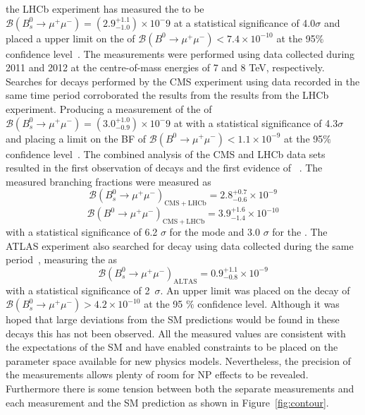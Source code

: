 the LHCb experiment has measured the \bsmumu \BF to be $\mathcal{B}(B^{0}_{s} \to \mu^+ \mu^-) = (2.9^{+1.1}_{-1.0})\times 10^-9$ at a statistical significance of 4.0$\sigma$ and placed a upper limit on the \bdmumu \BF of $\mathcal{B}(B^{0} \to \mu^+ \mu^-) < 7.4 \times 10^{-10}$ at the 95$\%$ confidence level~\cite{Aaij:2013aka}. The measurements were performed using data collected during 2011 and 2012 at the centre-of-mass energies of 7 and 8 TeV, respectively. Searches for \bmumu decays performed by the CMS experiment using data recorded in the same time period corroborated the results from the results from the LHCb experiment. Producing a measurement of the \bsmumu \BF of $\mathcal{B}(B^{0}_{s} \to \mu^+ \mu^-) = (3.0^{+1.0}_{-0.9})\times 10^-9$ at with a statistical significance of 4.3$\sigma$ and placing a limit on the \bdmumu BF of $\mathcal{B}(B^{0} \to \mu^+ \mu^-) < 1.1 \times 10^{-9}$ at the 95$\%$ confidence level~\cite{Chatrchyan:2013bka}. 
The combined analysis of the CMS and LHCb data sets resulted in the first observation of \bsmumu decays and the first evidence of \bdmumu~\cite{CMS:2014xfa}. The measured branching fractions were measured as
\begin{equation}
\mathcal{B}(B^{0}_{s} \to \mu^+ \mu^-)_{\mathrm{CMS + LHCb}}  = 2.8^{+0.7}_{-0.6} \times 10^{-9}
\end{equation}
\begin{equation}
\mathcal{B}(B^{0} \to \mu^+ \mu^-)_{\mathrm{CMS + LHCb}}  = 3.9^{+1.6}_{-1.4} \times 10^{-10}
\end{equation}
with a statistical significance of 6.2 $\sigma$ for the \bs mode and 3.0 $\sigma$ for the \bd. The ATLAS experiment also searched for \bmumu decay using data collected during the same period~\cite{Aaboud:2016ire}, measuring the \bsmumu \BF as 
\begin{equation}
\mathcal{B}(B^{0}_{s} \to \mu^+ \mu^-)_{\mathrm{ALTAS}}  = 0.9^{+1.1}_{-0.8} \times 10^{-9}
\end{equation}
with a statistical significance of 2~$\sigma$. An upper limit was placed on the \bdmumu decay of $\mathcal{B}(B^{0}_{s} \to \mu^+ \mu^-) >4.2 \times 10^{-10}$ at the 95 $\%$ confidence level.
Although it was hoped that large deviations from the SM predictions would be found in these decays this has not been observed. 
All the measured values are consistent with the expectations of the SM and have enabled constraints to be placed on the parameter space available for new physics models. Nevertheless, the precision of the measurements allows plenty of room for NP effects to be revealed. Furthermore there is some tension between both the separate measurements and each measurement and the SM prediction as shown in Figure~\ref{fig:contour}. 
